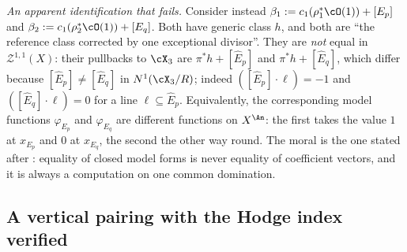 \begin{example}
\emph{An apparent identification that fails.}  Consider instead
$\beta_1:=c_1(\rho_1^*\cO(1))+[E_p]$ and
$\beta_2:=c_1(\rho_2^*\cO(1))+[E_q]$.  Both have generic class $h$, and
both are ``the reference class corrected by one exceptional divisor''.  They
are \emph{not} equal in $\mathcal Z^{1,1}(X)$: their pullbacks to
$\cX_3$ are $\pi^*h+[\widehat E_p]$ and $\pi^*h+[\widehat E_q]$,
which differ because $[\widehat E_p]\neq[\widehat E_q]$ in
$N^1(\cX_3/R)$; indeed $([\widehat E_p]\cdot\ell)=-1$ and
$([\widehat E_q]\cdot\ell)=0$ for a line $\ell\subseteq\widehat E_p$.
Equivalently, the corresponding model functions
$\varphi_{E_p}$ and $\varphi_{E_q}$ are different functions on
$X^{\An}$: the first takes the value $1$ at $x_{E_p}$ and $0$ at
$x_{E_q}$, the second the other way round.  The moral is the one stated
after : equality of closed model forms is
never equality of coefficient vectors, and it is always a computation on one
common domination.
\end{example}

\subsection{A vertical pairing with the Hodge index verified}
\label{sec:ch20-ex-hodge}

